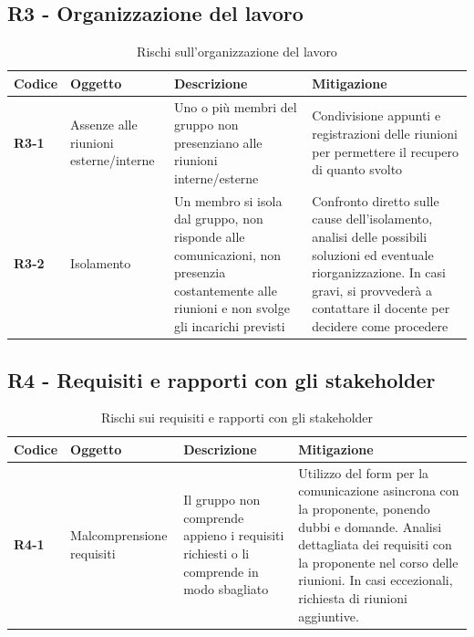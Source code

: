 \documentclass[a4paper,12pt]{article}
\begin{document}
    \subsection{R3 - Organizzazione del lavoro}
        \begin{table}[H]
        \label{tab:r3}
            \begin{tabularx}{\textwidth}{|l|L|L|L|}
            \hline
            \textbf{Codice} & \textbf{Oggetto} & \textbf{Descrizione} & \textbf{Mitigazione}\\
            \hline
            \textbf{R3-1} & Assenze alle riunioni esterne/interne & Uno o più membri del gruppo non presenziano alle riunioni interne/esterne & Condivisione appunti e registrazioni delle riunioni per permettere il recupero di quanto svolto\\
            \hline
            \textbf{R3-2} & Isolamento & Un membro si isola dal gruppo, non risponde alle comunicazioni, non presenzia costantemente alle riunioni e non svolge gli incarichi previsti & Confronto diretto sulle cause dell'isolamento, analisi delle possibili soluzioni ed eventuale riorganizzazione. In casi gravi, si provvederà a contattare il docente per decidere come procedere\\
            \hline
            \end{tabularx}
            \caption{Rischi sull'organizzazione del lavoro}
        \end{table}
        
    \subsection{R4 - Requisiti e rapporti con gli stakeholder}
        \begin{table}[H]
        \label{tab:r4}
            \begin{tabularx}{\textwidth}{|l|L|L|L|}
            \hline
            \textbf{Codice} & \textbf{Oggetto} & \textbf{Descrizione} & \textbf{Mitigazione}\\
            \hline
            \textbf{R4-1} & Malcomprensione requisiti & Il gruppo non comprende appieno i requisiti richiesti o li comprende in modo sbagliato & Utilizzo del form per la comunicazione asincrona con la proponente, ponendo dubbi e domande. Analisi dettagliata dei requisiti con la proponente nel corso delle riunioni. In casi eccezionali, richiesta di riunioni aggiuntive.\\
            \hline
            \end{tabularx}
            \caption{Rischi sui requisiti e rapporti con gli stakeholder}
        \end{table}
        
\end{document}
